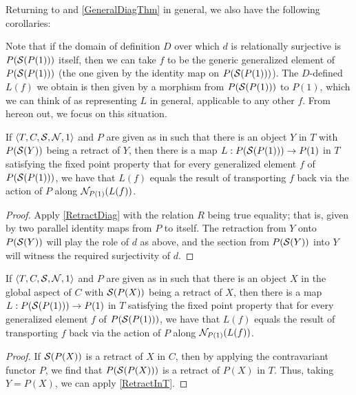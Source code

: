 Returning to  and \cref{GeneralDiagThm} in general, we also have the following corollaries:

\begin{corollary}\label{RetractDiag}
Note that if the domain of definition $D$ over which $d$ is relationally surjective is $P(\mathcal{S}(P(1)))$ itself, then we can take $f$ to be the generic generalized element of $P(\mathcal{S}(P(1)))$ (the one given by the identity map on $P(\mathcal{S}(P(1)))$). The $D$-defined $L(f)$ we obtain is then given by a morphism from $P(\mathcal{S}(P(1)))$ to $P(1)$, which we can think of as representing $L$ in general, applicable to any other $f$. From hereon out, we focus on this situation.
\end{corollary}

\begin{corollary}\label{RetractInT}
If $\langle T, C, \mathcal{S}, \mathcal{N}, 1 \rangle$ and $P$ are given as in  such that there is an object $Y$ in $T$ with $P(\mathcal{S}(Y))$ being a retract of $Y$, then there is a map $L : P(\mathcal{S}(P(1))) \to P(1)$ in $T$ satisfying the fixed point property that for every generalized element $f$ of $P(\mathcal{S}(P(1)))$, we have that $L(f)$ equals the result of transporting $f$ back via the action of $P$ along $\mathcal{N}_{P(1)}(L(f))$.
\end{corollary}
\begin{proof}
Apply \cref{RetractDiag} with the relation $R$ being true equality; that is, given by two parallel identity maps from $P$ to itself. The retraction from $Y$ onto $P(\mathcal{S}(Y))$ will play the role of $d$ as above, and the section from $P(\mathcal{S}(Y))$ into $Y$ will witness the required surjectivity of $d$.
\end{proof}

\begin{corollary}\label{RetractInC}
If $\langle T, C, \mathcal{S}, \mathcal{N}, 1 \rangle$ and $P$ are given as in  such that there is an object $X$ in the global aspect of $C$ with $\mathcal{S}(P(X))$ being a retract of $X$, then there is a map $L : P(\mathcal{S}(P(1))) \to P(1)$ in $T$ satisfying the fixed point property that for every generalized element $f$ of $P(\mathcal{S}(P(1)))$, we have that $L(f)$ equals the result of transporting $f$ back via the action of $P$ along $\mathcal{N}_{P(1)}(L(f))$.
\end{corollary}
\begin{proof}
If $\mathcal{S}(P(X))$ is a retract of $X$ in $C$, then by applying the contravariant functor $P$, we find that $P(\mathcal{S}(P(X)))$ is a retract of $P(X)$ in $T$. Thus, taking $Y = P(X)$, we can apply \cref{RetractInT}.
\end{proof}

